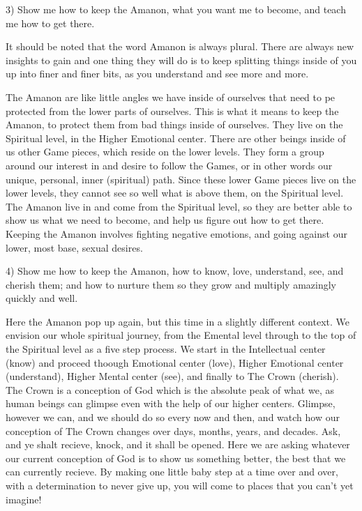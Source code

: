 \documentclass[12pt,letterpaper]{book}
\begin{document}
3) Show me how to keep the Amanon, what you want me to become, and teach me how to get there.

It should be noted that the word Amanon is always plural. There are always new insights to gain and one thing they will do is to keep splitting things inside of you up into finer and finer bits, as you understand and see more and more.

The Amanon are like little angles we have inside of ourselves that need to pe protected from the lower parts of ourselves. This is what it means to keep the Amanon, to protect them from bad things inside of ourselves. They live on the Spiritual level, in the Higher Emotional center. There are other beings inside of us other Game pieces, which reside on the lower levels. They form a group around our interest in and desire to follow the Games, or in other words our unique, personal, inner (spiritual) path. Since these lower Game pieces live on the lower levels, they cannot see so well what is above them, on the Spiritual level. The Amanon live in and come from the Spiritual level, so they are better able to show us what we need to become, and help us figure out how to get there. Keeping the Amanon involves fighting negative emotions, and going against our lower, most base, sexual desires.

4) Show me how to keep the Amanon, how to know, love, understand, see, and cherish them; and how to nurture them so they grow and multiply amazingly quickly and well.

Here the Amanon pop up again, but this time in a slightly different context. We envision our whole spiritual journey, from the Emental level through to the top of the Spiritual level as a five step process. We start in the Intellectual center (know) and proceed thoough Emotional center (love), Higher Emotional center (understand), Higher Mental center (see), and finally to The Crown (cherish). The Crown is a conception of God which is the absolute peak of what we, as human beings can glimpse even with the help of our higher centers. Glimpse, however we can, and we should do so every now and then, and watch how our conception of The Crown changes over days, months, years, and decades. Ask, and ye shalt recieve, knock, and it shall be opened. Here we are asking whatever our current conception of God is to show us something better, the best that we can currently recieve. By making one little baby step at a time over and over, with a determination to never give up, you will come to places that you can't yet imagine!
\end{document}
